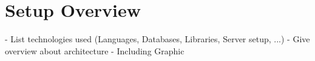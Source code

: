 \section{Setup Overview}

-	List technologies used (Languages, Databases, Libraries, Server setup, ...)
-	Give overview about architecture
-	Including Graphic
